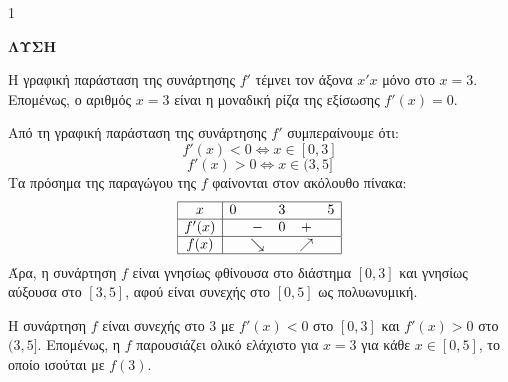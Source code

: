 \begin{ylh}{1}
    \item [Ύλη από εικόνα]
\end{ylh}
\textbf{ΛΥΣΗ}
\begin{alist}
    \item Η γραφική παράσταση της συνάρτησης $f'$ τέμνει τον άξονα $x'x$ μόνο στο $x=3$. Επομένως, ο αριθμός $x=3$ είναι η μοναδική ρίζα της εξίσωσης $f'(x)=0$.
    \item Από τη γραφική παράσταση της συνάρτησης $f'$ συμπεραίνουμε ότι:
    \[
        f'(x) < 0 \Leftrightarrow x \in [0,3]
    \]
    \[
        f'(x) > 0 \Leftrightarrow x \in (3,5]
    \]
    Τα πρόσημα της παραγώγου της $f$ φαίνονται στον ακόλουθο πίνακα:
    \[
    \begin{array}{|c|ccccc|}
        \hline
        x & 0 & & 3 & & 5 \\
        \hline
        f'(x) & & - & 0 & + & \\
        \hline
        f(x) & & \searrow & & \nearrow & \\
        \hline
    \end{array}
    \]
    Άρα, η συνάρτηση $f$ είναι γνησίως φθίνουσα στο διάστημα $[0,3]$ και γνησίως αύξουσα στο $[3,5]$, αφού είναι συνεχής στο $[0,5]$ ως πολυωνυμική.
    \item Η συνάρτηση $f$ είναι συνεχής στο $3$ με $f'(x) < 0$ στο $[0,3]$ και $f'(x) > 0$ στο $(3,5]$. Επομένως, η $f$ παρουσιάζει ολικό ελάχιστο για $x=3$ για κάθε $x \in [0,5]$, το οποίο ισούται με $f(3)$.
\end{alist}